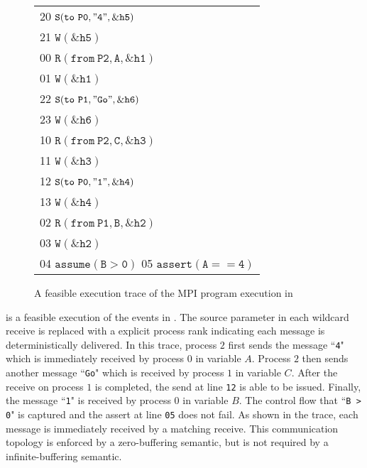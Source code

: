 \begin{figure}[b]
\begin{center}
\setlength{\tabcolsep}{2pt}
\small \begin{tabular}[t]{l}
20 $\mathtt{S(to\ P0, "4", \&h5)}$ \\
21 $\mathtt{W(\&h5)}$\\
\hline
00 $\mathtt{R(from\ P2, A, \&h1)}$ \\
01 $\mathtt{W(\&h1)}$ \\
\hline
22 $\mathtt{S(to\ P1, "Go", \&h6)}$ \\
23 $\mathtt{W(\&h6)}$ \\
\hline
10 $\mathtt{R(from\ P2, C, \&h3)}$ \\
11 $\mathtt{W(\&h3)}$ \\
12 $\mathtt{S(to\ P0, "1", \&h4)}$ \\
13 $\mathtt{W(\&h4)}$ \\
\hline
02 $\mathtt{R(from\ P1, B, \&h2)}$ \\
03 $\mathtt{W(\&h2)}$ \\
04 $\mathtt{assume(B > 0)}$
05 $\mathtt{assert(A == 4)}$ \\
\hline
\end{tabular}
\end{center}
\caption{A feasible execution trace of the MPI program execution in }
\label{fig:trace1}
\end{figure}

 is a feasible execution of the events in . The source parameter in each wildcard receive is replaced with a explicit process rank indicating each message is deterministically delivered. In this trace, process $2$ first sends the message ``\texttt{4}" which is immediately received by process $0$ in variable $A$. Process $2$ then sends another message ``\texttt{Go}" which is received by process $1$ in variable $C$. After the receive on process $1$ is completed, the send at line \texttt{12} is able to be issued. Finally, the message ``\texttt{1}" is received by process $0$ in variable $B$. The control flow that ``\texttt{B > 0}" is captured and the assert at line \texttt{05} does not fail. As shown in the trace, each message is immediately received by a matching receive. This communication topology is enforced by a zero-buffering semantic, but is not required by a infinite-buffering semantic.

